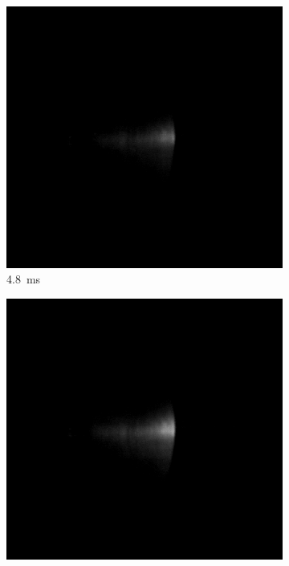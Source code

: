 \begin{figure}[!ht]
    \centering
    \begin{subfigure}[t]{0.3\textwidth}
        \centering
        \includegraphics[width=\textwidth]{assets/4 experiments/CW LSP frames Photron/LSP385_V2_CW1_Fr48.png}
        \caption{\qty{4.8}{ms}}
    \end{subfigure}
    \hfill
    \begin{subfigure}[t]{0.3\textwidth}
        \centering
        \includegraphics[width=\textwidth]{assets/4 experiments/CW LSP frames Photron/LSP385_V2_CW1_Fr250.png}

\end{subfigure}
\end{figure}
